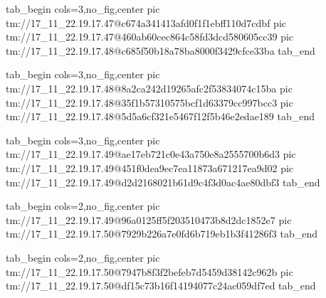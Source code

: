 \ifcmt
  tab_begin cols=3,no_fig,center
    pic tm://17_11_22.19.17.47@c674a341413afd0f1f1ebff110d7cdbf
    pic tm://17_11_22.19.17.47@460ab60cec864c58fd3dcd580605cc39
    pic tm://17_11_22.19.17.48@c685f50b18a78ba8000f3429cfce33ba
  tab_end
\fi


\ifcmt
  tab_begin cols=3,no_fig,center
    pic tm://17_11_22.19.17.48@8a2ca242d19265afc2f53834074c15ba
    pic tm://17_11_22.19.17.48@35f1b57310575bcf1d63379cc997bcc3
    pic tm://17_11_22.19.17.48@5d5a6cf321e5467f12f5b46e2edae189
  tab_end
\fi


\ifcmt
  tab_begin cols=3,no_fig,center
    pic tm://17_11_22.19.17.49@ae17eb721c0e43a750e8a2555700b6d3
    pic tm://17_11_22.19.17.49@451f0dea9ec7ea11873a671217ea9d02
    pic tm://17_11_22.19.17.49@d2d2168021b61d9c4f3d0ac4ae80dbf3
  tab_end
\fi


\ifcmt
  tab_begin cols=2,no_fig,center
    pic tm://17_11_22.19.17.49@96a0125ff5f203510473b8d2dc1852e7
    pic tm://17_11_22.19.17.50@7929b226a7e0fd6b719eb1b3f41286f3
  tab_end
\fi


\ifcmt
  tab_begin cols=2,no_fig,center
    pic tm://17_11_22.19.17.50@7947b8f3f2befeb7d5459d38142c962b
    pic tm://17_11_22.19.17.50@df15c73b16f14194077c24ac059df7ed
  tab_end
\fi

